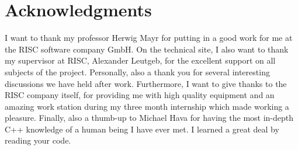 \chapter*{Acknowledgments}

I want to thank my professor Herwig Mayr for putting in a good work for me at the RISC software company GmbH. On the technical site, I also want to thank my supervisor at RISC, Alexander Leutgeb, for the excellent support on all subjects of the project. Personally, also a thank you for several interesting discussions we have held after work. Furthermore, I want to give thanks to the RISC company itself, for providing me with high quality equipment and an amazing work station during my three month internship which made working a pleasure. Finally, also a thumb-up to Michael Hava for having the most in-depth C++ knowledge of a human being I have ever met. I learned a great deal by reading your code.
